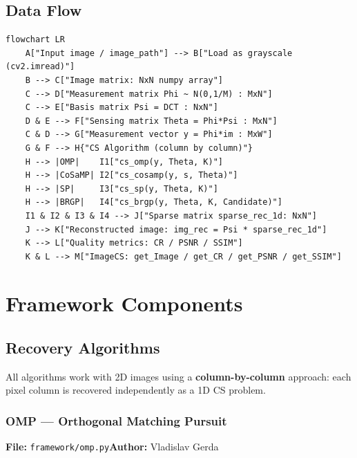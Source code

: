 \documentclass[12pt,a4paper]{article}
\newcommand{\cs}[1]{\texttt{#1}}          %
\begin{document}
\subsection{Data Flow}

\begin{lstlisting}[style=mermaid,caption={End-to-end data flow (Mermaid source)}]
flowchart LR
    A["Input image / image_path"] --> B["Load as grayscale (cv2.imread)"]
    B --> C["Image matrix: NxN numpy array"]
    C --> D["Measurement matrix Phi ~ N(0,1/M) : MxN"]
    C --> E["Basis matrix Psi = DCT : NxN"]
    D & E --> F["Sensing matrix Theta = Phi*Psi : MxN"]
    C & D --> G["Measurement vector y = Phi*im : MxW"]
    G & F --> H{"CS Algorithm (column by column)"}
    H --> |OMP|    I1["cs_omp(y, Theta, K)"]
    H --> |CoSaMP| I2["cs_cosamp(y, s, Theta)"]
    H --> |SP|     I3["cs_sp(y, Theta, K)"]
    H --> |BRGP|   I4["cs_brgp(y, Theta, K, Candidate)"]
    I1 & I2 & I3 & I4 --> J["Sparse matrix sparse_rec_1d: NxN"]
    J --> K["Reconstructed image: img_rec = Psi * sparse_rec_1d"]
    K --> L["Quality metrics: CR / PSNR / SSIM"]
    K & L --> M["ImageCS: get_Image / get_CR / get_PSNR / get_SSIM"]
\end{lstlisting}

\section{Framework Components}

\subsection{Recovery Algorithms}

All algorithms work with 2D images using a \textbf{column-by-column} approach:
each pixel column is recovered independently as a 1D CS problem.

\subsubsection{OMP --- Orthogonal Matching Pursuit}

\textbf{File:} \cs{framework/omp.py}\quad\textbf{Author:} Vladislav Gerda
\end{document}
